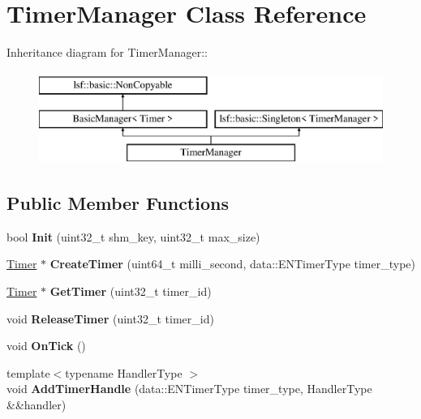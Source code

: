 \hypertarget{classTimerManager}{
\section{TimerManager Class Reference}
\label{classTimerManager}
}
Inheritance diagram for TimerManager::\begin{figure}[H]
\begin{center}
\leavevmode
\includegraphics[height=3cm]{classTimerManager}
\end{center}
\end{figure}
\subsection*{Public Member Functions}
\begin{DoxyCompactItemize}
\item 
\hypertarget{classTimerManager_aa1a214b434d5aeed16ebd88c7a67fdb2}{
bool {\bfseries Init} (uint32\_\-t shm\_\-key, uint32\_\-t max\_\-size)}
\label{classTimerManager_aa1a214b434d5aeed16ebd88c7a67fdb2}

\item 
\hypertarget{classTimerManager_a8b6d06e83fa028b0a96ff5e102716936}{
\hyperlink{classTimer}{Timer} $\ast$ {\bfseries CreateTimer} (uint64\_\-t milli\_\-second, data::ENTimerType timer\_\-type)}
\label{classTimerManager_a8b6d06e83fa028b0a96ff5e102716936}

\item 
\hypertarget{classTimerManager_a1247d4bfc6159d81b8bdf2307f53dc54}{
\hyperlink{classTimer}{Timer} $\ast$ {\bfseries GetTimer} (uint32\_\-t timer\_\-id)}
\label{classTimerManager_a1247d4bfc6159d81b8bdf2307f53dc54}

\item 
\hypertarget{classTimerManager_a8ee6859d7ab5c9172c9c58a576023969}{
void {\bfseries ReleaseTimer} (uint32\_\-t timer\_\-id)}
\label{classTimerManager_a8ee6859d7ab5c9172c9c58a576023969}

\item 
\hypertarget{classTimerManager_a17e09453e26d72d7f00c8611239bb4ba}{
void {\bfseries OnTick} ()}
\label{classTimerManager_a17e09453e26d72d7f00c8611239bb4ba}

\item 
\hypertarget{classTimerManager_ad0fa10103c71526a900349d723cb9aa5}{
{\footnotesize template$<$typename HandlerType $>$ }\\void {\bfseries AddTimerHandle} (data::ENTimerType timer\_\-type, HandlerType \&\&handler)}
\label{classTimerManager_ad0fa10103c71526a900349d723cb9aa5}

\end{DoxyCompactItemize}
